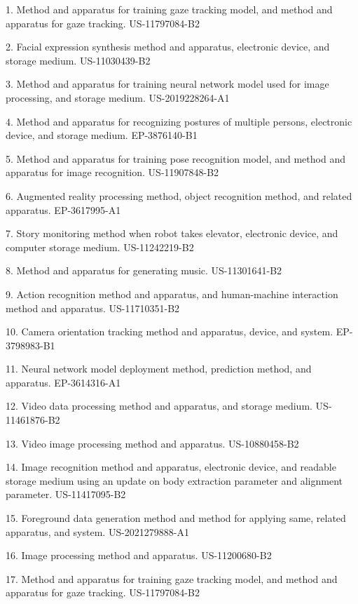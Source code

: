 \documentclass[10pt]{article}
\makeatletter
\newlength{\bibhang}
\newlength{\bibsep}
 {\@listi \global\bibsep\itemsep \global\advance\bibsep by\parsep}
\newenvironment{bibsection}%
        {\vspace{\itemsep}\begin{list}{}{%
       \setlength{\leftmargin}{\bibhang}%
       \setlength{\itemsep}{\bibsep}%
       \setlength{\parsep}{\z@}%
        \setlength{\partopsep}{0pt}%
        \setlength{\topsep}{0pt}}}
        {\end{list}\vspace{\itemsep}}
\makeatother
\begin{document}
\begin{bibsection}
  \item[1.] Method and apparatus for training gaze tracking model, and method and apparatus for gaze tracking. US-11797084-B2
  \item[2.] Facial expression synthesis method and apparatus, electronic device, and storage medium. US-11030439-B2
  \item[3.] Method and apparatus for training neural network model used for image processing, and storage medium. US-2019228264-A1
  \item[4.] Method and apparatus for recognizing postures of multiple persons, electronic device, and storage medium. EP-3876140-B1
  \item[5.] Method and apparatus for training pose recognition model, and method and apparatus for image recognition. US-11907848-B2
  \item[6.] Augmented reality processing method, object recognition method, and related apparatus. EP-3617995-A1
  \item[7.] Story monitoring method when robot takes elevator, electronic device, and computer storage medium. US-11242219-B2
  \item[8.] Method and apparatus for generating music. US-11301641-B2
  \item[9.] Action recognition method and apparatus, and human-machine interaction method and apparatus. US-11710351-B2
  \item[10.] Camera orientation tracking method and apparatus, device, and system. EP-3798983-B1
  \item[11.] Neural network model deployment method, prediction method, and apparatus. EP-3614316-A1
  \item[12.] Video data processing method and apparatus, and storage medium. US-11461876-B2
  \item[13.] Video image processing method and apparatus. US-10880458-B2
  \item[14.] Image recognition method and apparatus, electronic device, and readable storage medium using an update on body extraction parameter and alignment parameter. US-11417095-B2
  \item[15.] Foreground data generation method and method for applying same, related apparatus, and system. US-2021279888-A1
  \item[16.] Image processing method and apparatus. US-11200680-B2
  \item[17.] Method and apparatus for training gaze tracking model, and method and apparatus for gaze tracking. US-11797084-B2

\end{bibsection}
\end{document}
